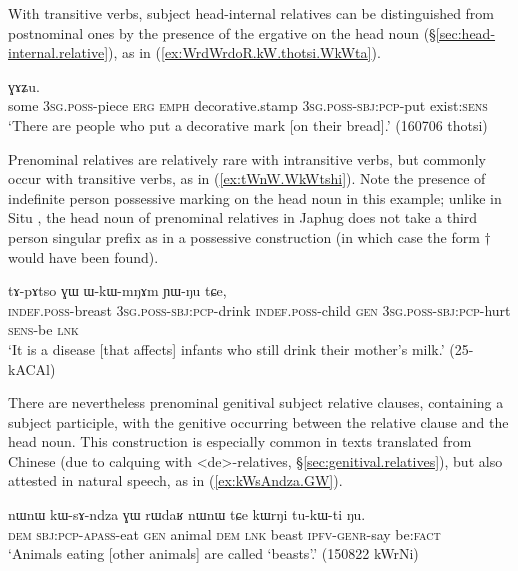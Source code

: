 With transitive verbs, subject head-internal relatives can be distinguished from postnominal ones by the presence of the ergative  on the head noun (§\ref{sec:head-internal.relative}), as in (\ref{ex:WrdWrdoR.kW.thotsi.WkWta}).

\begin{exe}
\ex \label{ex:WrdWrdoR.kW.thotsi.WkWta}
  ɣɤʑu. \\
 some \textsc{3sg}.\textsc{poss}-piece \textsc{erg} \textsc{emph} decorative.stamp \textsc{3sg}.\textsc{poss}-\textsc{sbj}:\textsc{pcp}-put exist:\textsc{sens} \\
 \glt `There are people who put a decorative mark [on their bread].' (160706 thotsi) 
\end{exe}

Prenominal relatives are relatively rare with intransitive verbs, but commonly occur with transitive verbs, as in (\ref{ex:tWnW.WkWtshi}). Note the presence of indefinite person possessive marking on the head noun  in this example; unlike in Situ \citep{jacksonlin07}, the head noun of prenominal relatives in Japhug does not take a third person singular prefix as in a possessive construction (in which case the form $\dagger$ would have been found).

\begin{exe}
\ex \label{ex:tWnW.WkWtshi}
 \gll  [tɯ-nɯ ɯ-kɯ-tsʰi] tɤ-pɤtso ɣɯ ɯ-kɯ-mŋɤm ɲɯ-ŋu tɕe, \\
 \textsc{indef}.\textsc{poss}-breast \textsc{3sg}.\textsc{poss}-\textsc{sbj}:\textsc{pcp}-drink \textsc{indef}.\textsc{poss}-child \textsc{gen} \textsc{3sg}.\textsc{poss}-\textsc{sbj}:\textsc{pcp}-hurt \textsc{sens}-be \textsc{lnk} \\
 \glt `It is a disease [that affects] infants who still drink their mother's milk.' (25-kACAl)
\end{exe}

There are nevertheless prenominal genitival subject relative clauses, containing a subject participle, with the genitive  occurring between the relative clause and the head noun. This construction is especially common in texts translated from Chinese (due to calquing with  <de>-relatives, §\ref{sec:genitival.relatives}), but also attested in natural speech, as in (\ref{ex:kWsAndza.GW}).

\begin{exe}
\ex \label{ex:kWsAndza.GW}
 \gll nɯnɯ kɯ-sɤ-ndza ɣɯ rɯdaʁ nɯnɯ tɕe kɯrŋi tu-kɯ-ti ŋu.  \\
 \textsc{dem} \textsc{sbj}:\textsc{pcp}-\textsc{apass}-eat \textsc{gen} animal \textsc{dem} \textsc{lnk} beast \textsc{ipfv}-\textsc{genr}-say be:\textsc{fact} \\
 \glt `Animals eating [other animals] are called `beasts'.' (150822 kWrNi)
\end{exe}

